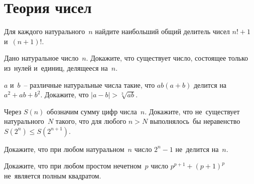 
\section*{Теория чисел}


\begin{problems}

\item
Для каждого натурального~$n$ найдите наибольший общий делитель чисел $n! + 1$
и~$(n + 1)!$.

\item
Дано натуральное число~$n$.
Докажите, что существует число, состоящее только из~нулей и~единиц, делящееся
на~$n$.

\item
$a$ и~$b$~-- различные натуральные числа такие, что $a b (a + b)$ делится
на~$a^2 + a b + b^2$.
Докажите, что $|a - b| > \sqrt[3]{a b}$.

\item
Через $S(n)$ обозначим сумму цифр числа~$n$.
Докажите, что не~существует натурального~$N$ такого, что для любого $n > N$
выполнялось~бы неравенство $S(2^n) \leq S(2^{n+1})$.

\item
Докажите, что при любом натуральном~$n$ число $2^n - 1$ не~делится на~$n$.

\item
Докажите, что при любом простом нечетном~$p$ число $p^{p+1} + (p + 1)^p$
не~является полным квадратом. 


\end{problems}

